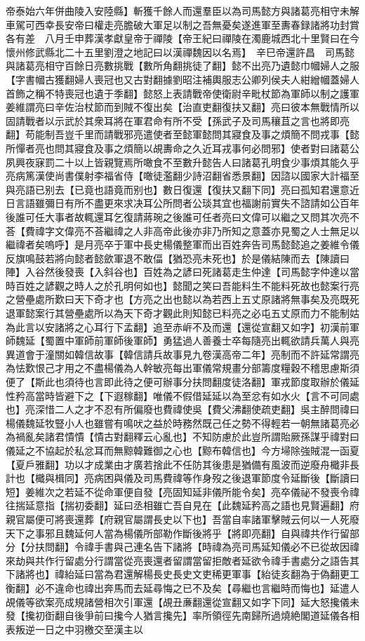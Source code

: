 帝泰始六年併曲陵入安陸縣】斬獲千餘人而還羣臣以為司馬懿方與諸葛亮相守未解車駕可西幸長安帝曰權走亮膽破大軍足以制之吾無憂矣遂進軍至夀春録諸將功封賞各有差　八月壬申葬漢孝獻皇帝于禪陵【帝王紀曰禪陵在濁鹿城西北十里賢曰在今懷州修武縣北二十五里劉澄之地記曰以漢禪魏因以名焉】　辛巳帝還許昌　司馬懿與諸葛亮相守百餘日亮數挑戰【數所角翻挑徒了翻】懿不出亮乃遺懿巾幗婦人之服【字書幗古獲翻婦人喪冠也又古對翻據劉昭注補輿服志公卿列侯夫人紺繒幗蓋婦人首飾之稱不特喪冠也遺于季翻】懿怒上表請戰帝使衛尉辛毗杖節為軍師以制之護軍姜維謂亮曰辛佐治杖節而到賊不復出矣【治直吏翻復扶又翻】亮曰彼本無戰情所以固請戰者以示武於其衆耳將在軍君命有所不受【孫武子及司馬穰苴之言也將即亮翻】苟能制吾豈千里而請戰邪亮遣使者至懿軍懿問其寢食及事之煩簡不問戎事【懿所憚者亮也問其寢食及事之煩簡以覘夀命之久近耳戎事何必問邪】使者對曰諸葛公夙興夜寐罰二十以上皆親覽焉所噉食不至數升懿告人曰諸葛孔明食少事煩其能久乎亮病篤漢使尚書僕射李福省侍【噉徒濫翻少詩沼翻省悉景翻】因諮以國家大計福至與亮語已别去【已竟也語竟而别也】數日復還【復扶又翻下同】亮曰孤知君還意近日言語雖彌日有所不盡更來求决耳公所問者公琰其宜也福謝前實失不諮請如公百年後誰可任大事者故輒還耳乞復請蔣琬之後誰可任者亮曰文偉可以繼之又問其次亮不荅【費禕字文偉亮不荅繼禕之人非高帝此後亦非乃所知之意蓋亦見蜀之人士無足以繼禕者矣嗚呼】是月亮卒于軍中長史楊儀整軍而出百姓奔告司馬懿懿追之姜維令儀反旗鳴鼓若將向懿者懿歛軍退不敢偪【猶恐亮未死也】於是儀結陳而去【陳讀曰陣】入谷然後發喪【入斜谷也】百姓為之諺曰死諸葛走生仲達【司馬懿字仲達以當時百姓之諺觀之時人之於孔明何如也】懿聞之笑曰吾能料生不能料死故也懿案行亮之營壘處所歎曰天下奇才也【方亮之出也懿以為若西上五丈原諸將無事矣及亮既死退軍懿案行其營壘處所以為天下奇才觀此則知懿已料亮之必屯五丈原而力不能制姑為此言以安諸將之心耳行下孟翻】追至赤㟁不及而還【還從宣翻又如字】初漢前軍師魏延【蜀置中軍師前軍師後軍師】勇猛過人善養士卒每隨亮出輒欲請兵萬人與亮異道會于潼關如韓信故事【韓信請兵故事見九卷漢高帝二年】亮制而不許延常謂亮為怯歎恨己才用之不盡楊儀為人幹敏亮每出軍儀常規畫分部籌度糧穀不稽思慮斯須便了【斯此也須待也言即此待之便可辦事分扶問翻度徒洛翻】軍戎節度取辦於儀延性矜高當時皆避下之【下遐稼翻】唯儀不假借延延以為至忿有如水火【言不可同處也】亮深惜二人之才不忍有所偏廢也費禕使吳【費父沸翻使疏吏翻】吳主醉問禕曰楊儀魏延牧豎小人也雖嘗有鳴吠之益於時務然既己任之勢不得輕若一朝無諸葛亮必為禍亂矣諸君憒憒【憒古對翻釋云心亂也】不知防慮於此豈所謂貽厥孫謀乎禕對曰儀延之不協起於私忿耳而無黥韓難御之心也【黥布韓信也】今方埽除強賊混一函夏【夏戶雅翻】功以才成業由才廣若捨此不任防其後患是猶備有風波而逆廢舟檝非長計也【檝與楫同】亮病困與儀及司馬費禕等作身歿之後退軍節度令延斷後【斷讀曰短】姜維次之若延不從命軍便自發【亮固知延非儀所能令矣】亮卒儀祕不發喪令禕往揣延意指【揣初委翻】延曰丞相雖亡吾自見在【此魏延矜高之語也見賢遍翻】府親官屬便可將喪還葬【府親官屬謂長史以下也】吾當自率諸軍擊賊云何以一人死廢天下之事邪且魏延何人當為楊儀所部勒作斷後將乎【將即亮翻】自與禕共作行留部分【分扶問翻】令禕手書與己連名告下諸將【時禕為亮司馬延知儀必不已從故因禕來劫與共作行留處分行謂當從亮喪還者留謂當留拒敵者延欲令禕手書處分之語告其下諸將也】禕紿延曰當為君還解楊長史長史文吏稀更軍事【紿徒亥翻為于偽翻更工衡翻】必不違命也禕出奔馬而去延尋悔之已不及矣【尋繼也言繼時而悔也】延遣人覘儀等欲案亮成規諸營相次引軍還【覘丑亷翻還從宣翻又如字下同】延大怒攙儀未發【攙初衘翻自後爭前曰攙今人猶言攙先】率所領徑先南歸所過燒絶閣道延儀各相表叛逆一日之中羽檄交至漢主以